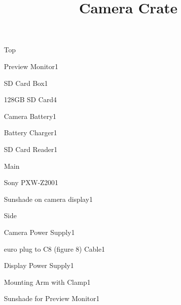 \def\papersize{5}




\title{Camera Crate}

\begin{checklist}{Top}
  \item{Preview Monitor}{1}
  \item{SD Card Box}{1}
  \item{128GB SD Card}{4}
  \item{Camera Battery}{1}
  \item{Battery Charger}{1}
  \item{SD Card Reader}{1}
\end{checklist}

\begin{checklist}{Main}
  \item{Sony PXW-Z200}{1}
  \item{Sunshade on camera display}{1}
\end{checklist}

\begin{checklist}{Side}
  \item{Camera Power Supply}{1}
  \item{euro plug to C8 (figure 8) Cable}{1}
  \item{Display Power Supply}{1}
  \item{Mounting Arm with Clamp}{1}
  \item{Sunshade for Preview Monitor}{1}
\end{checklist}


